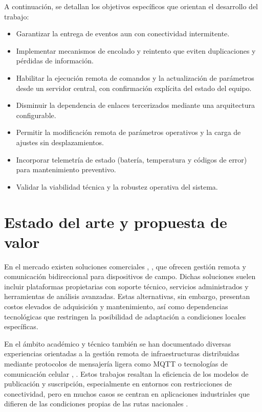 A continuación, se detallan los objetivos específicos que orientan el desarrollo del trabajo:
\begin{itemize}

\item  Garantizar la entrega de eventos aun con conectividad intermitente.

\item Implementar mecanismos de encolado y reintento que eviten duplicaciones y pérdidas de información.

\item  Habilitar la ejecución remota de comandos y la actualización de parámetros desde un servidor central, con confirmación explícita del estado del equipo.

\item  Disminuir la dependencia de enlaces tercerizados mediante una arquitectura configurable.

\item  Permitir la modificación remota de parámetros operativos y la carga de ajustes sin desplazamientos.

\item Incorporar telemetría de estado (batería, temperatura y códigos de error) para mantenimiento preventivo.

\item Validar la viabilidad técnica y la robustez operativa del sistema.
\end{itemize}


\section{Estado del arte y propuesta de valor}

En el mercado existen soluciones comerciales \cite{exemys}, \cite{digiRemoteManager}, que ofrecen gestión remota y comunicación bidireccional para dispositivos de campo. Dichas soluciones suelen incluir plataformas propietarias con soporte técnico, servicios administrados y herramientas de análisis avanzadas. Estas alternativas, sin embargo, presentan costos elevados de adquisición y mantenimiento, así como dependencias tecnológicas que restringen la posibilidad de adaptación a condiciones locales específicas.

En el ámbito académico y técnico también se han documentado diversas experiencias orientadas a la gestión remota de infraestructuras distribuidas mediante protocolos de mensajería ligera como MQTT o tecnologías de comunicación celular \cite{monitoringVehicles2023}, \cite{iotSmartTraffic2021}. Estos trabajos resaltan la eficiencia de los modelos de publicación y suscripción, especialmente en entornos con restricciones de conectividad, pero en muchos casos se centran en aplicaciones industriales que difieren de las condiciones propias de las rutas nacionales \cite{iopMQTTSystem2023}.

